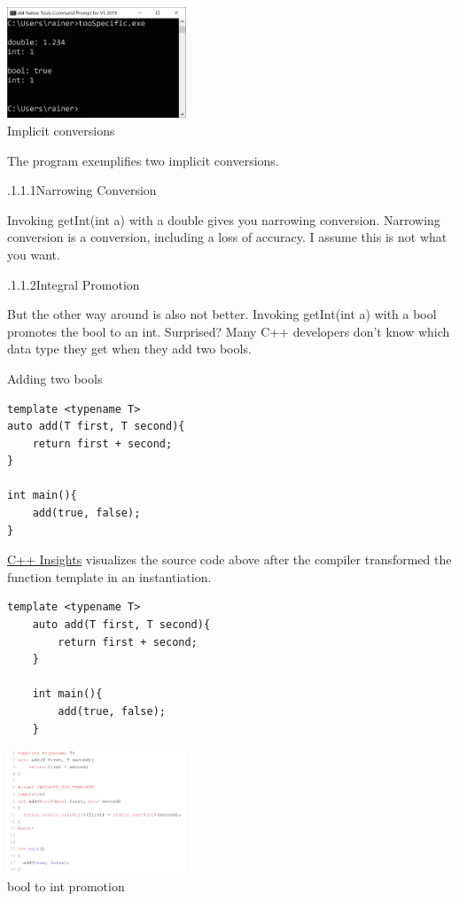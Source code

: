 \begin{center}
\includegraphics[width=0.4\textwidth]{content/3/chapter4/images/3.png}\\
Implicit conversions
\end{center}

The program exemplifies two implicit conversions.

.1.1.1\hspace{0.2cm}Narrowing Conversion

Invoking getInt(int a) with a double gives you narrowing conversion. Narrowing conversion is a conversion, including a loss of accuracy. I assume this is not what you want.

.1.1.2\hspace{0.2cm}Integral Promotion

But the other way around is also not better. Invoking getInt(int a) with a bool promotes the bool to an int. Surprised? Many C++ developers don’t know which data type they get when they add two bools.

\noindent
Adding two bools
\begin{lstlisting}[style=styleCXX]
template <typename T>
auto add(T first, T second){
	return first + second;
}

int main(){
	add(true, false);
}
\end{lstlisting}

\href{https://cppinsights.io/s/9bd14f99}{C++ Insights} visualizes the source code above after the compiler transformed the function template in an instantiation.

\begin{lstlisting}[style=styleCXX]
	template <typename T>
	auto add(T first, T second){
		return first + second;
	}
	
	int main(){
		add(true, false);
	}
\end{lstlisting}

\begin{center}
\includegraphics[width=0.4\textwidth]{content/3/chapter4/images/1-1.png}\\
bool to int promotion
\end{center}

